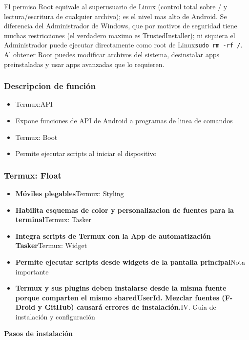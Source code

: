 
El permiso Root equivale al superusuario de Linux (control total sobre / y lectura/escritura de cualquier archivo); es el nivel mas alto de Android. Se diferencia del Administrador de Windows, que por motivos de seguridad tiene muchas restricciones (el verdadero maximo es TrustedInstaller); ni siquiera el Administrador puede ejecutar directamente como root de Linux\texttt{sudo rm -\allowbreak rf /\allowbreak *}. Al obtener Root puedes modificar archivos del sistema, desinstalar apps preinstaladas y usar apps avanzadas que lo requieren.

\subsubsection*{Descripcion de función}

\begin{itemize}
  \item Termux:API
  \item Expone funciones de API de Android a programas de linea de comandos
  \item Termux: Boot
  \item Permite ejecutar scripts al iniciar el dispositivo
\end{itemize}

\subsubsection*{Termux: Float}

\begin{itemize}
  \item \textbf{Móviles plegables}Termux: Styling
  \item \textbf{Habilita esquemas de color y personalizacion de fuentes para la terminal}Termux: Tasker
  \item \textbf{Integra scripts de Termux con la App de automatización Tasker}Termux: Widget
  \item \textbf{Permite ejecutar scripts desde widgets de la pantalla principal}Nota importante
  \item \textbf{Termux y sus plugins deben instalarse desde la misma fuente porque comparten el mismo sharedUserId. Mezclar fuentes (F-Droid y GitHub) causará errores de instalación.}IV. Guia de instalación y configuración
\end{itemize}

\textbf{Pasos de instalación}\par

